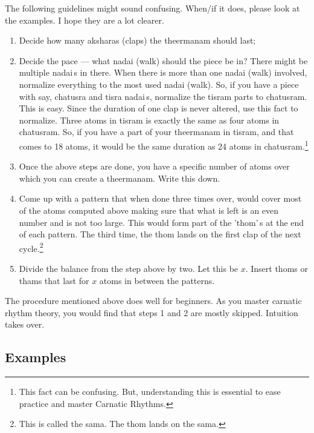 The following guidelines might sound confusing. When/if it does, please look at the
examples. I hope they are a lot clearer.
\begin{enumerate}
  \item Decide how many aksharas (claps) the theermanam should last;
  \item Decide the pace --- what nadai (walk) should the piece be in? There might be
    multiple nadai\,s in there. When there is more than one nadai (walk) involved,
    normalize everything to the most used nadai (walk). So, if you have a piece with
    say, chatusra and tisra nadai\,s, normalize the tisram parts to chatusram. This
    is easy. Since the duration of one clap is never altered, use this fact to
    normalize. Three atoms in tisram is exactly the same as four atoms in chatusram.
    So, if you have a part of your theermanam in tisram, and that comes to 18 atoms,
    it would be the same duration as 24 atoms in chatusram.\footnote{This fact can be
    confusing. But, understanding this is essential to ease practice and master
    Carnatic Rhythms.}
  \item Once the above steps are done, you have a specific number of atoms over which
    you can create a theermanam. Write this down.
  \item Come up with a pattern that when done three times over, would cover most of
    the atoms computed above making sure that what is left is an even number and is
    not too large. This would form part of the 'thom'\,s at the end of each pattern.
    The third time, the thom lands on the first clap of the next cycle.\footnote{This
    is called the sama. The thom lands on the sama.}
  \item Divide the balance from the step above by two. Let this be $x$. Insert thoms
    or thams that last for $x$ atoms in between the patterns.
\end{enumerate}

The procedure mentioned above does well for beginners. As you master carnatic rhythm
theory, you would find that steps 1 and 2 are mostly skipped. Intuition takes over.

\subsection{Examples}

